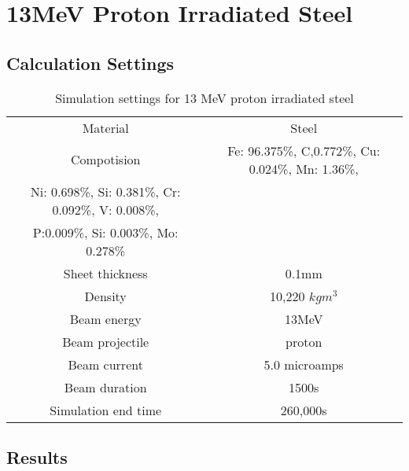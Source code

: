 \FloatBarrier
\clearpage
\section{13MeV Proton Irradiated Steel}
\label{appendix:alexsteel}

\subsection{Calculation Settings}

\begin{table}[h]
\begin{center}
\begin{tabular}{c c}
\hline\hline
Material & Steel \\
Compotision & Fe: 96.375\%, C,0.772\%, Cu: 0.024\%, Mn: 1.36\%, \\Ni: 0.698\%, Si: 0.381\%, Cr: 0.092\%, V: 0.008\%, \\P:0.009\%, Si: 0.003\%, Mo: 0.278\% \\
Sheet thickness & 0.1mm \\
Density & 10,220 $kg m^{3}$ \\
Beam energy & 13MeV \\
Beam projectile & proton \\
Beam current & 5.0 microamps \\
Beam duration & 1500s \\
Simulation end time & 260,000s \\
\hline\hline
\end{tabular}
\end{center}
\caption{Simulation settings for 13 MeV proton irradiated steel}
\label{table:appendixironsettings}
\end{table}



\FloatBarrier
\subsection{Results}

